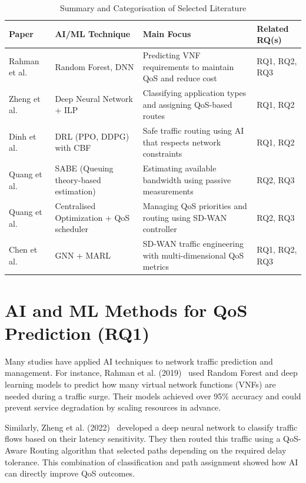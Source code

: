 \documentclass[a4paper,12pt]{Classes/RoboticsLaTeX}
\begin{document}
\begin{table}[h]
\centering
\caption{Summary and Categorisation of Selected Literature}
\label{tab:lit-summary}
\begin{tabular}{|p{3.1cm}|p{3.0cm}|p{4.4cm}|p{1.8cm}|}
\hline
\textbf{Paper} & \textbf{AI/ML Technique} & \textbf{Main Focus} & \textbf{Related RQ(s)} \\
\hline
Rahman et al.~\cite{rahman2019autoscaling} & Random Forest, DNN & Predicting VNF requirements to maintain QoS and reduce cost & RQ1, RQ2, RQ3 \\
\hline
Zheng et al.~\cite{zheng2022applicationaware} & Deep Neural Network + ILP & Classifying application types and assigning QoS-based routes & RQ1, RQ2 \\
\hline
Dinh et al.~\cite{dinh2024safeloadbalancing} & DRL (PPO, DDPG) with CBF & Safe traffic routing using AI that respects network constraints & RQ1, RQ2 \\
\hline
Quang et al.~\cite{quang2023globalqos} & SABE (Queuing theory-based estimation) & Estimating available bandwidth using passive measurements & RQ2, RQ3 \\
\hline
Quang et al.~\cite{quang2022routing} & Centralised Optimization + QoS scheduler & Managing QoS priorities and routing using SD-WAN controller & RQ2, RQ3 \\
\hline
Chen et al.~\cite{chen2025mteal} & GNN + MARL & SD-WAN traffic engineering with multi-dimensional QoS metrics & RQ1, RQ2, RQ3 \\
\hline
\end{tabular}
\end{table}

\section{AI and ML Methods for QoS Prediction (RQ1)}

Many studies have applied AI techniques to network traffic prediction and management. For instance, Rahman et al. (2019)~\cite{rahman2019autoscaling} used Random Forest and deep learning models to predict how many virtual network functions (VNFs) are needed during a traffic surge. Their models achieved over 95\% accuracy and could prevent service degradation by scaling resources in advance.

Similarly, Zheng et al. (2022)~\cite{zheng2022applicationaware} developed a deep neural network to classify traffic flows based on their latency sensitivity. They then routed this traffic using a QoS-Aware Routing algorithm that selected paths depending on the required delay tolerance. This combination of classification and path assignment showed how AI can directly improve QoS outcomes.
\end{document}
